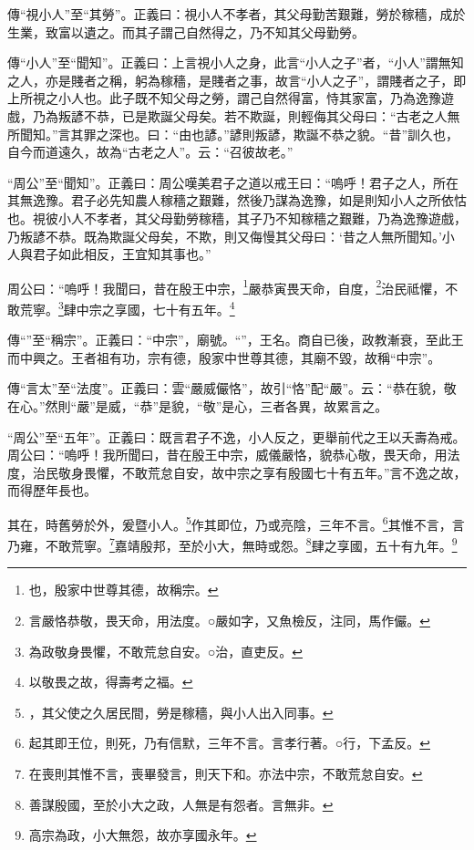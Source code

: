 {\noindent\zhuan{}\fzbyks 傳“視小人”至“其勞”。正義曰：視小人不孝者，其父母勤苦艱難，勞於稼穡，成於生業，致富以遺之。而其子謂己自然得之，乃不知其父母勤勞。 \par}

{\noindent\zhuan{}\fzbyks 傳“小人”至“聞知”。正義曰：上言視小人之身，此言“小人之子”者，“小人”謂無知之人，亦是賤者之稱，躬為稼穡，是賤者之事，故言“小人之子”，謂賤者之子，即上所視之小人也。此子既不知父母之勞，謂己自然得富，恃其家富，乃為逸豫遊戲，乃為叛諺不恭，已是欺誕父母矣。若不欺誕，則輕侮其父母曰：“古老之人無所聞知。”言其罪之深也。曰：“由也諺。”諺則叛諺，欺誕不恭之貌。“昔”訓久也，自今而道遠久，故為“古老之人”。云：“召彼故老。” \par}

{\noindent\shu{}\fzkt “周公”至“聞知”。正義曰：周公嘆美君子之道以戒王曰：“嗚呼！君子之人，所在其無逸豫。君子必先知農人稼穡之艱難，然後乃謀為逸豫，如是則知小人之所依怙也。視彼小人不孝者，其父母勤勞稼穡，其子乃不知稼穡之艱難，乃為逸豫遊戲，乃叛諺不恭。既為欺誕父母矣，不欺，則又侮慢其父母曰：‘昔之人無所聞知。’小人與君子如此相反，王宜知其事也。” \par}

周公曰：“嗚呼！我聞曰，昔在殷王中宗，\footnote{也，殷家中世尊其德，故稱宗。}嚴恭寅畏天命，自度，\footnote{言嚴恪恭敬，畏天命，用法度。○嚴如字，又魚檢反，注同，馬作儼。}治民祗懼，不敢荒寧。\footnote{為政敬身畏懼，不敢荒怠自安。○治，直吏反。}肆中宗之享國，七十有五年。\footnote{以敬畏之故，得壽考之福。}


{\noindent\zhuan{}\fzbyks 傳“”至“稱宗”。正義曰：“中宗”，廟號。“”，王名。商自已後，政教漸衰，至此王而中興之。王者祖有功，宗有德，殷家中世尊其德，其廟不毀，故稱“中宗”。 \par}

{\noindent\zhuan{}\fzbyks 傳“言太”至“法度”。正義曰：雲“嚴威儼恪”，故引“恪”配“嚴”。云：“恭在貌，敬在心。”然則“嚴”是威，“恭”是貌，“敬”是心，三者各異，故累言之。 \par}

{\noindent\shu{}\fzkt “周公”至“五年”。正義曰：既言君子不逸，小人反之，更舉前代之王以夭壽為戒。周公曰：“嗚呼！我所聞曰，昔在殷王中宗，威儀嚴恪，貌恭心敬，畏天命，用法度，治民敬身畏懼，不敢荒怠自安，故中宗之享有殷國七十有五年。”言不逸之故，而得歷年長也。 \par}

其在，時舊勞於外，爰暨小人。\footnote{，其父使之久居民間，勞是稼穡，與小人出入同事。}作其即位，乃或亮陰，三年不言。\footnote{起其即王位，則死，乃有信默，三年不言。言孝行著。○行，下孟反。}其惟不言，言乃雍，不敢荒寧。\footnote{在喪則其惟不言，喪畢發言，則天下和。亦法中宗，不敢荒怠自安。}嘉靖殷邦，至於小大，無時或怨。\footnote{善謀殷國，至於小大之政，人無是有怨者。言無非。}肆之享國，五十有九年。\footnote{高宗為政，小大無怨，故亦享國永年。}


